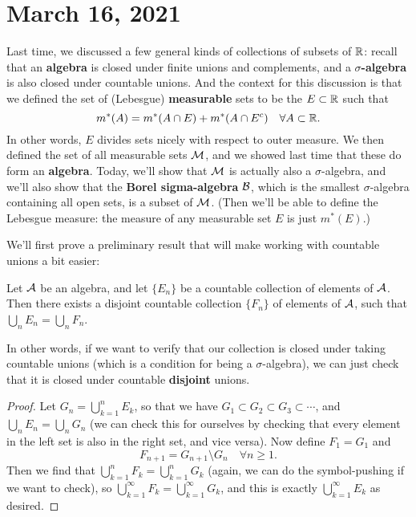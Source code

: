 \pagebreak\section*{March 16, 2021}

Last time, we discussed a few general kinds of collections of subsets of $\mathbb R$: recall that an \textbf{algebra} is closed under finite unions and complements, and a \textbf{$\sigma$-algebra} is also closed under countable unions. And the context for this discussion is that we defined the set of (Lebesgue) \textbf{measurable} sets to be the $E \subset \mathbb R$ such that
\[
    m^\ast(A) = m^\ast(A \cap E) + m^\ast(A \cap E^c) \quad \forall A \subset \mathbb R.
\]
In other words, $E$ divides sets nicely with respect to outer measure. We then defined the set of all measurable sets $\mathcal{M}$, and we showed last time that these do form an \textbf{algebra}. Today, we'll show that $\mathcal{M}$ is actually also a $\sigma$-algebra, and we'll also show that the \textbf{Borel sigma-algebra} $\mathcal{B}$, which is the smallest $\sigma$-algebra containing all open sets, is a subset of $\mathcal{M}$. (Then we'll be able to define the Lebesgue measure: the measure of any measurable set $E$ is just $m^\ast(E)$.)

We'll first prove a preliminary result that will make working with countable unions a bit easier: 

\begin{lemma}\label{countabledisjoint}
Let $\mathcal{A}$ be an algebra, and let $\{E_n\}$ be a countable collection of elements of $\mathcal{A}$. Then there exists a disjoint countable collection $\{F_n\}$ of elements of $\mathcal{A}$, such that $\bigcup_n E_n = \bigcup_n F_n$. 
\end{lemma}

In other words, if we want to verify that our collection is closed under taking countable unions (which is a condition for being a $\sigma$-algebra), we can just check that it is closed under countable \textbf{disjoint} unions.

\begin{proof}
Let $G_n = \bigcup_{k=1}^n E_k$, so that we have $G_1 \subset G_2 \subset G_3 \subset \cdots$, and $\bigcup_n E_n = \bigcup_n G_n$ (we can check this for ourselves by checking that every element in the left set is also in the right set, and vice versa). Now define $F_1 = G_1$ and
\[
    F_{n+1} = G_{n+1} \setminus G_n \quad \forall n \ge 1.
\]
Then we find that $\bigcup_{k=1}^n F_k = \bigcup_{k=1}^n G_k$ (again, we can do the symbol-pushing if we want to check), so $\bigcup_{k=1}^{\infty} F_k = \bigcup_{k=1}^{\infty} G_k$, and this is exactly $\bigcup_{k=1}^{\infty} E_k$ as desired.
\end{proof}


